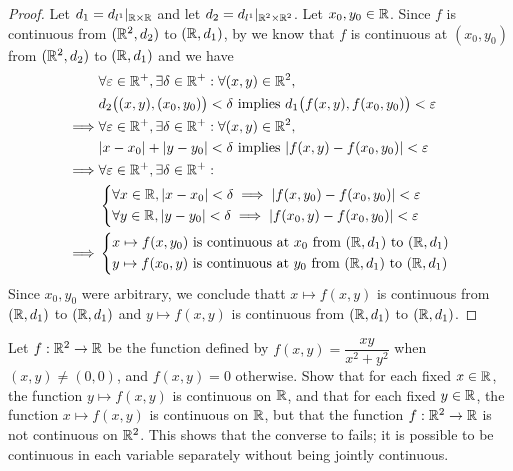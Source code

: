 \begin{proof}
  Let \(d_1 = d_{l^1}|_{\mathbb{R} \times \mathbb{R}}\) and let \(d_2 = d_{l^1}|_{\mathbb{R}^2 \times \mathbb{R}^2}\).
  Let \(x_0, y_0 \in \mathbb{R}\).
  Since \(f\) is continuous from \((\mathbb{R}^2, d_2)\) to \((\mathbb{R}, d_1)\), by  we know that \(f\) is continuous at \((x_0, y_0)\) from \((\mathbb{R}^2, d_2)\) to \((\mathbb{R}, d_1)\) and we have
  \begin{align*}
             & \forall \varepsilon \in \R^+, \exists \delta \in \R^+ : \forall (x, y) \in \R^2,                          \\
             & d_2\big((x, y), (x_0, y_0)\big) < \delta \text{ implies } d_1\big(f(x, y), f(x_0, y_0)\big) < \varepsilon \\
    \implies & \forall \varepsilon \in \R^+, \exists \delta \in \R^+ : \forall (x, y) \in \R^2,                          \\
             & \abs{x - x_0} + \abs{y - y_0} < \delta \text{ implies } \abs{f(x, y) - f(x_0, y_0)} < \varepsilon         \\
    \implies & \forall \varepsilon \in \R^+, \exists \delta \in \R^+ :                                                   \\
             & \begin{dcases}
                 \forall x \in \R, \abs{x - x_0} < \delta \implies \abs{f(x, y_0) - f(x_0, y_0)} < \varepsilon \\
                 \forall y \in \R, \abs{y - y_0} < \delta \implies \abs{f(x_0, y) - f(x_0, y_0)} < \varepsilon
               \end{dcases}             \\
    \implies & \begin{dcases}
                 x \mapsto f(x, y_0) \text{ is continuous at } x_0 \text{ from } (\R, d_1) \text{ to } (\R, d_1) \\
                 y \mapsto f(x_0, y) \text{ is continuous at } y_0 \text{ from } (\R, d_1) \text{ to } (\R, d_1)
               \end{dcases}
  \end{align*}
  Since \(x_0, y_0\) were arbitrary, we conclude thatt \(x \mapsto f(x, y)\) is continuous from \((\mathbb{R}, d_1)\) to \((\mathbb{R}, d_1)\) and \(y \mapsto f(x, y)\) is continuous from \((\mathbb{R}, d_1)\) to \((\mathbb{R}, d_1)\).
\end{proof}

\begin{ex}\label{ii:ex:2.2.11}
  Let \(f : \mathbb{R}^2 \to \mathbb{R}\) be the function defined by \(f(x, y) = \dfrac{xy}{x^2 + y^2}\) when \((x, y) \neq (0, 0)\), and \(f(x, y) = 0\) otherwise.
  Show that for each fixed \(x \in \mathbb{R}\), the function \(y \mapsto f(x, y)\) is continuous on \(\mathbb{R}\), and that for each fixed \(y \in \mathbb{R}\), the function \(x \mapsto f(x, y)\) is continuous on \(\mathbb{R}\), but that the function \(f : \mathbb{R}^2 \to \mathbb{R}\) is not continuous on \(\mathbb{R}^2\).
  This shows that the converse to  fails;
  it is possible to be continuous in each variable separately without being jointly continuous.
\end{ex}

